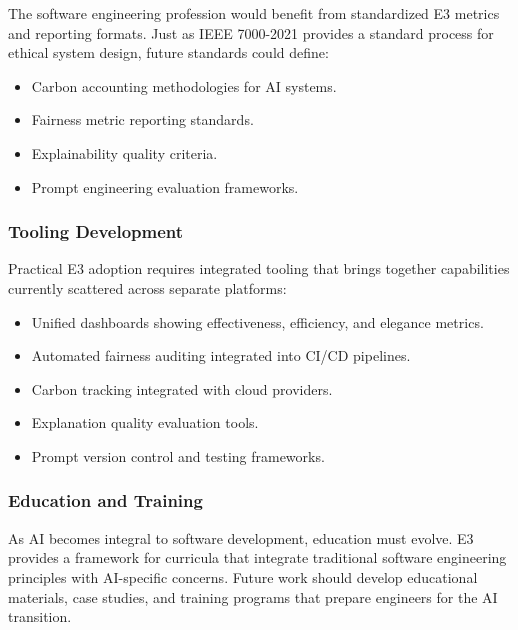 \documentclass[11pt,a4paper]{article}
\begin{document}
The software engineering profession would benefit from standardized E3 metrics and reporting formats. Just as IEEE 7000-2021 \cite{ieee7000:2021} provides a standard process for ethical system design, future standards could define:

\begin{itemize}[leftmargin=2em]
    \item Carbon accounting methodologies for AI systems.
    \item Fairness metric reporting standards.
    \item Explainability quality criteria.
    \item Prompt engineering evaluation frameworks.
\end{itemize}

\subsubsection{Tooling Development}

Practical E3 adoption requires integrated tooling that brings together capabilities currently scattered across separate platforms:

\begin{itemize}[leftmargin=2em]
    \item Unified dashboards showing effectiveness, efficiency, and elegance metrics.
    \item Automated fairness auditing integrated into CI/CD pipelines.
    \item Carbon tracking integrated with cloud providers.
    \item Explanation quality evaluation tools.
    \item Prompt version control and testing frameworks.
\end{itemize}

\subsubsection{Education and Training}

As AI becomes integral to software development, education must evolve. E3 provides a framework for curricula that integrate traditional software engineering principles with AI-specific concerns. Future work should develop educational materials, case studies, and training programs that prepare engineers for the AI transition.


\end{document}
